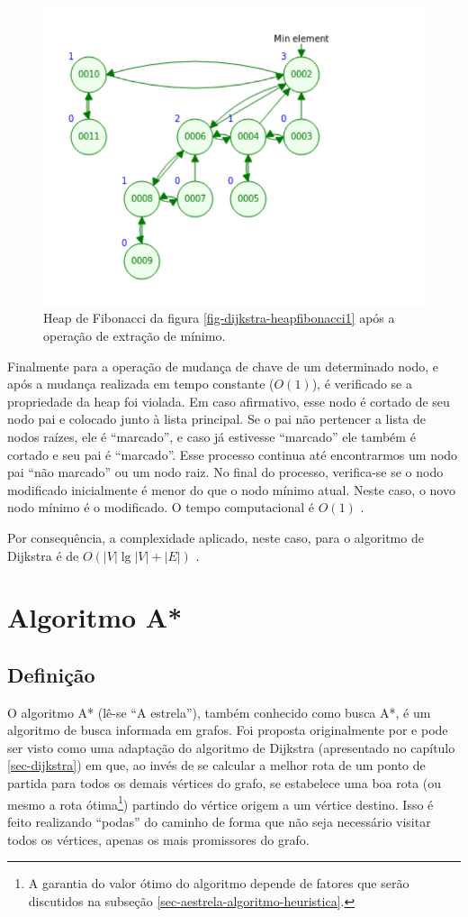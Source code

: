 \begin{figure}[H]
\centering
\includegraphics[width=.54\textwidth]{figuras/fibonacci-heap2} 
\caption{Heap de Fibonacci da figura \ref{fig-dijkstra-heapfibonacci1} após a operação de extração de mínimo.}
\label{fig-dijkstra-heapfibonacci2}
\end{figure}


Finalmente para a operação de mudança de chave de um determinado nodo, e após a mudança realizada em tempo constante ($O(1)$), é verificado se a propriedade da heap foi violada. Em caso afirmativo, esse nodo é cortado de seu nodo pai e colocado junto à lista principal. Se o pai não pertencer a lista de nodos raízes, ele é ``marcado'', e caso já estivesse ``marcado'' ele também é cortado e seu pai é ``marcado''. Esse processo continua até encontrarmos um nodo pai ``não marcado'' ou um nodo raiz. No final do processo, verifica-se se o nodo modificado inicialmente é menor do que o nodo mínimo atual. Neste caso, o novo nodo mínimo é o modificado. O tempo computacional é $O(1)$ \cite{cormen2009introduction}.

Por consequência, a complexidade aplicado, neste caso, para o algoritmo de Dijkstra é de $O(|V|\lg |V| + |E|)$ \cite{cormen2009introduction}.

\section{Algoritmo A*}
\label{sec-aestrela}

\subsection{Definição}
\label{sec-aestrela-algoritmo}
O algoritmo A* (lê-se ``A estrela''), também conhecido como busca A*, é um algoritmo de busca informada em grafos. Foi proposta originalmente por  e pode ser visto como uma adaptação do algoritmo de Dijkstra (apresentado no capítulo \ref{sec-dijkstra}) em que, ao invés de se calcular a melhor rota de um ponto de partida para todos os demais vértices do grafo, se estabelece uma boa rota (ou mesmo a rota ótima\footnote{A garantia do valor ótimo do algoritmo depende de fatores que serão discutidos na subseção \ref{sec-aestrela-algoritmo-heuristica}.}) partindo do vértice origem a um vértice destino. Isso é feito realizando ``podas'' do caminho de forma que não seja necessário visitar todos os vértices, apenas os mais promissores do grafo.

